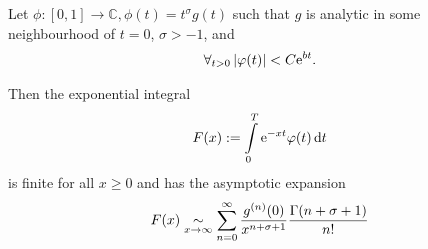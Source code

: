 Let $\phi\colon [0,1] \to \mathbb{C}, \phi(t) = t^\sigma g(t)$ such that $g$ is
analytic in some neighbourhood of $t=0$, $\sigma > -1$, and
\begin{align*}
    \forall_{t > 0} \left|\phi(t)\right| < C \Eto{bt}.
\end{align*}

Then the exponential integral
\begin{align*}
    F(x) := \Integ[T]{0}{t}{\Eto{-xt}\phi(t)}
\end{align*}
is finite for all $x \geq 0$ and has the asymptotic expansion
\begin{align*}
    F(x)\SimAs{x\to\infty}\sum_{n=0}^{\infty}
    \frac{g^{(n)}(0)}{x^{n+\sigma+1}} \frac{\Gamma(n+\sigma+1)}{n!}
\end{align*}
